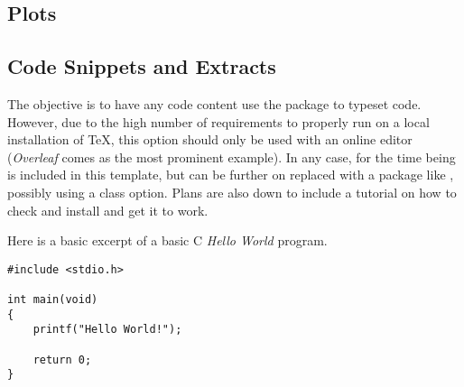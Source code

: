 \documentclass{ist-report}
\begin{document}
\subsection{Plots}

\subsection{Code Snippets and Extracts}

The objective is to have any code content use the  package to typeset code. However, due to the high number of requirements to properly run  on a local installation of \TeX{}, this option should only be used with an online editor (\textit{Overleaf} comes as the most prominent example). In any case, for the time being  is included in this template, but can be further on replaced with a package like , possibly using a class option. Plans are also down to include a tutorial on how to check and install  and get it to work.

Here is a basic excerpt of a basic C \textit{Hello World} program.
\begin{verbatim}
#include <stdio.h>

int main(void)
{
    printf("Hello World!");
    
    return 0;
}
\end{verbatim}
\end{document}
